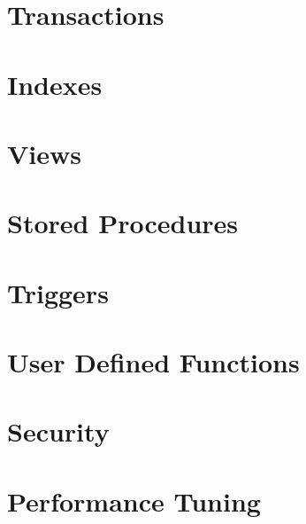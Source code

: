 \section{Transactions}
\section{Indexes}
\section{Views}
\section{Stored Procedures}
\section{Triggers}
\section{User Defined Functions}
\section{Security}
\section{Performance Tuning}


